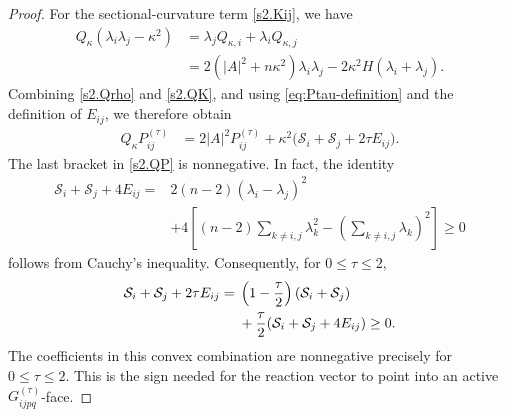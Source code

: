 \documentclass[11pt,reqno]{amsart}
\theoremstyle{definition}
\theoremstyle{remark}
\numberwithin{equation}{section}
\begin{document}
\begin{proof}
For the sectional-curvature term \eqref{s2.Kij}, we have
\begin{align}\label{s2.QK}
 Q_\kappa(\lambda_i\lambda_j-\kappa^2)
 &=\lambda_jQ_{\kappa,i}
   +\lambda_iQ_{\kappa,j}\nonumber\\
 &=2(|A|^2+n\kappa^2)\lambda_i\lambda_j
   -2\kappa^2H(\lambda_i+\lambda_j).
\end{align}
Combining \eqref{s2.Qrho} and \eqref{s2.QK}, and using \eqref{eq:Ptau-definition} 
and the definition of $E_{ij}$, we therefore obtain
\begin{align}
 Q_\kappa P_{ij}^{(\tau)}
 &=2|A|^2P_{ij}^{(\tau)}
   +\kappa^2\bigl(
      \mathcal S_i+\mathcal S_j+2\tau E_{ij}
   \bigr).
 \label{s2.QP}
\end{align}
The last bracket in \eqref{s2.QP} is nonnegative.  In fact, the identity
\begin{align*}
 \mathcal S_i+\mathcal S_j+4E_{ij}
 ={}&2(n-2)(\lambda_i-\lambda_j)^2\\
 &+4\left[(n-2)\sum_{k\ne i,j}\lambda_k^2
           -\left(\sum_{k\ne i,j}\lambda_k\right)^2\right]\geq0
\end{align*}
follows from Cauchy's inequality.  Consequently, for $0\leq\tau\leq2$,
\begin{align}
 \mathcal S_i+\mathcal S_j+2\tau E_{ij}
 ={}&\left(1-\frac\tau2\right)(\mathcal S_i+\mathcal S_j)\notag\\
 &+\frac\tau2(\mathcal S_i+\mathcal S_j+4E_{ij})\geq0.
 \label{eq:tau-reaction-convex-combination}
\end{align}
The coefficients in this convex combination are nonnegative precisely for
$0\leq\tau\leq2$.  This is the sign needed for the reaction vector to point
into an active $G_{ijpq}^{(\tau)}$-face.


\end{proof}
\end{document}
